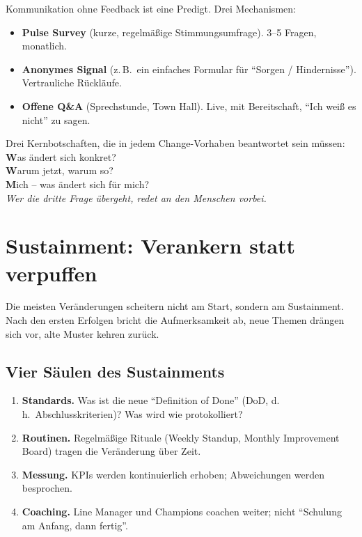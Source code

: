 \documentclass[11pt,a4paper,oneside]{article}
\newcommand{\caveatfontfallback}{\itshape}
\newcommand\caveatfont{\caveatfontfallback}%
\newcommand{\akzent}[1]{{\caveatfont\color{lpAmber}#1}}
\newcommand{\fachbegriff}[1]{\textbf{#1}}
\begin{document}
Kommunikation ohne Feedback ist eine Predigt. Drei Mechanismen:

\begin{itemize}
  \item \textbf{Pulse Survey} (kurze, regelmäßige Stimmungsumfrage). 3--5 Fragen, monatlich.
  \item \textbf{Anonymes Signal} (z.\,B.\ ein einfaches Formular für ``Sorgen / Hindernisse''). Vertrauliche Rückläufe.
  \item \textbf{Offene Q\&A} (Sprechstunde, Town Hall). Live, mit Bereitschaft, ``Ich weiß es nicht'' zu sagen.
\end{itemize}

\begin{eselsbox}[Eselsbrücke: \akzent{W-W-M}]
Drei Kernbotschaften, die in jedem Change-Vorhaben beantwortet sein müssen:\\[2pt]
\textbf{W}as ändert sich konkret?\\
\textbf{W}arum jetzt, warum so?\\
\textbf{M}ich -- was ändert sich für mich?\\[2pt]
\emph{Wer die dritte Frage übergeht, redet an den Menschen vorbei.}
\end{eselsbox}

\section{Sustainment: Verankern statt verpuffen}

Die meisten Veränderungen scheitern nicht am Start, sondern am Sustainment. Nach den ersten Erfolgen bricht die Aufmerksamkeit ab, neue Themen drängen sich vor, alte Muster kehren zurück.

\subsection{Vier Säulen des Sustainments}

\begin{enumerate}
  \item \fachbegriff{Standards.} Was ist die neue ``Definition of Done'' (DoD, d.\,h.\ Abschlusskriterien)? Was wird wie protokolliert?
  \item \fachbegriff{Routinen.} Regelmäßige Rituale (Weekly Standup, Monthly Improvement Board) tragen die Veränderung über Zeit.
  \item \fachbegriff{Messung.} KPIs werden kontinuierlich erhoben; Abweichungen werden besprochen.
  \item \fachbegriff{Coaching.} Line Manager und Champions coachen weiter; nicht ``Schulung am Anfang, dann fertig''.
\end{enumerate}
\end{document}
